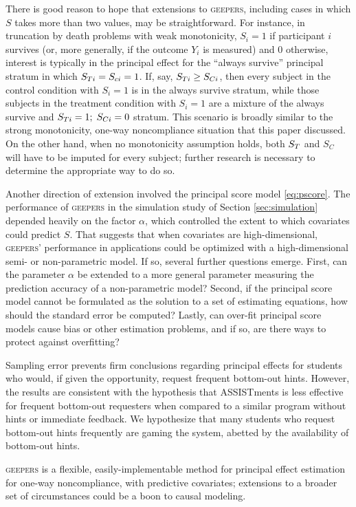 \documentclass[]{article}
\begin{document}
There is good reason to hope that extensions to \textsc{geepers}, including cases in which $S$ takes more than two values, may be straightforward.
For instance, in truncation by death problems \citep[e.g.][]{zhangRubin,ding2011} with weak monotonicity, $S_i=1$ if participant $i$ survives (or, more generally, if the outcome $Y_i$ is measured) and 0 otherwise, interest is typically in the principal effect for the ``always survive'' principal stratum in which $S_{Ti}=S_{ci}=1$.
If, say, $S_{Ti}\ge S_{Ci}$, then every subject in the control condition with $S_i=1$ is in the always survive stratum, while those subjects in the treatment condition with $S_i=1$ are a mixture of the always survive and $S_{Ti}=1;\;S_{Ci}=0$ stratum.
This scenario is broadly similar to the strong monotonicity, one-way noncompliance situation that this paper discussed.
On the other hand, when no monotonicity assumption holds, both $S_T$ and $S_C$ will have to be imputed for every subject; further research is necessary to determine the appropriate way to do so.

Another direction of extension involved the principal score model \eqref{eq:pscore}.
The performance of \textsc{geepers} in the simulation study of Section \ref{sec:simulation} depended heavily on the factor $\alpha$, which controlled the extent to which covariates could predict $S$.
That suggests that when covariates are high-dimensional, \textsc{geepers}' performance in applications could be optimized with a high-dimensional semi- or non-parametric model.
If so, several further questions emerge.
First, can the parameter $\alpha$ be extended to a more general parameter measuring the prediction accuracy of a non-parametric model?
Second, if the principal score model cannot be formulated as the solution to a set of estimating equations, how should the standard error be computed?
Lastly, can over-fit principal score models cause bias or other estimation problems, and if so, are there ways to protect against overfitting?

Sampling error prevents firm conclusions regarding principal effects for students who would, if given the opportunity, request frequent bottom-out hints.
However, the results are consistent with the hypothesis that ASSISTments is less effective for frequent bottom-out requesters when compared to a similar program without hints or immediate feedback. We hypothesize that many students who request bottom-out hints frequently are gaming the system, abetted by the availability of bottom-out hints.

\textsc{geepers} is a flexible, easily-implementable method for principal effect estimation for one-way noncompliance, with predictive covariates; extensions to a broader set of circumstances could be a boon to causal modeling.
\end{document}
